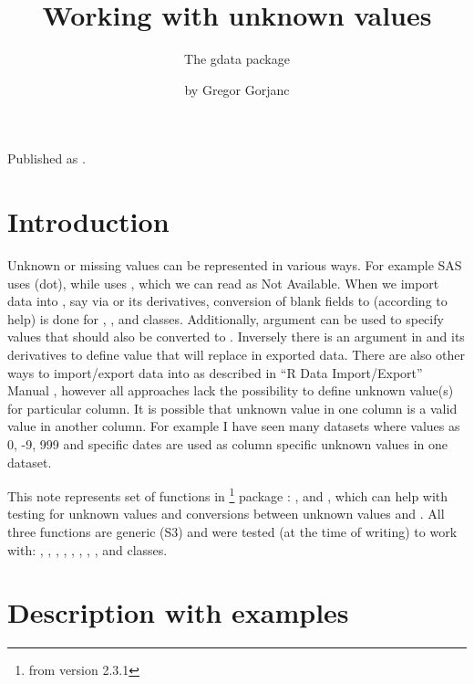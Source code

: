 \documentclass[a4paper]{report}
\begin{document}
\begin{article}

\title{Working with unknown values}
\subtitle{The gdata package}
\author{by Gregor Gorjanc}

\maketitle

Published as \cite{Gorjanc}.

\section{Introduction}

Unknown or missing values can be represented in various ways. For example
SAS uses  (dot), while \R{} uses , which we can read as
Not Available. When we import data into \R{}, say via  or
its derivatives, conversion of blank fields to  (according to
 help) is done for , ,
 and  classes. Additionally, 
argument can be used to specify values that should also be converted to
. Inversely there is an argument  in 
and its derivatives to define value that will replace  in exported
data. There are also other ways to import/export data into \R{} as
described in ``R Data Import/Export'' Manual \citep{RImportExportManual},
however all approaches lack the possibility to define unknown value(s) for
particular column. It is possible that unknown value in one column is a
valid value in another column. For example I have seen many datasets where
values as 0, -9, 999 and specific dates are used as column specific unknown
values in one dataset.

This note represents set of functions in \footnote{from version
  2.3.1} package \citep{WarnesGdata}: , 
and , which can help with testing for unknown values and
conversions between unknown values and . All three functions are
generic (S3) and were tested (at the time of writing) to work with:
, , , ,
, , , , 
and  classes.

\section{Description with examples}


\end{article}
\end{document}

